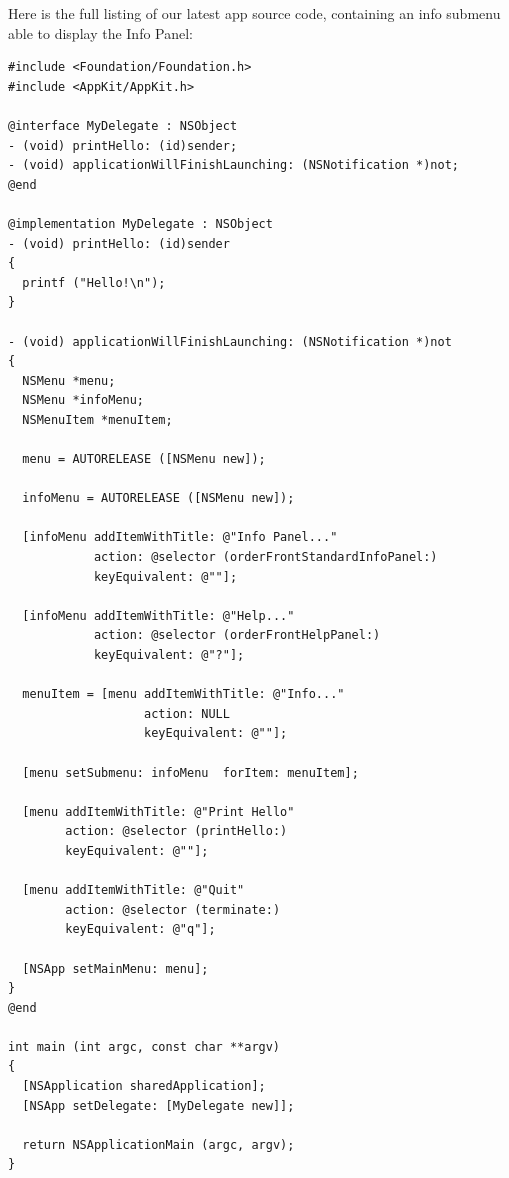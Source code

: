 \documentclass[a4paper]{article}
\begin{document}
Here is the full listing of our latest app source code, 
containing an info submenu able to display the Info Panel:
\begin{verbatim}
#include <Foundation/Foundation.h>
#include <AppKit/AppKit.h>

@interface MyDelegate : NSObject
- (void) printHello: (id)sender;
- (void) applicationWillFinishLaunching: (NSNotification *)not;
@end

@implementation MyDelegate : NSObject 
- (void) printHello: (id)sender
{
  printf ("Hello!\n");
}

- (void) applicationWillFinishLaunching: (NSNotification *)not
{
  NSMenu *menu;
  NSMenu *infoMenu;
  NSMenuItem *menuItem;

  menu = AUTORELEASE ([NSMenu new]);

  infoMenu = AUTORELEASE ([NSMenu new]);

  [infoMenu addItemWithTitle: @"Info Panel..." 
            action: @selector (orderFrontStandardInfoPanel:) 
            keyEquivalent: @""];

  [infoMenu addItemWithTitle: @"Help..." 
            action: @selector (orderFrontHelpPanel:)
            keyEquivalent: @"?"];

  menuItem = [menu addItemWithTitle: @"Info..." 
                   action: NULL 
                   keyEquivalent: @""];

  [menu setSubmenu: infoMenu  forItem: menuItem];

  [menu addItemWithTitle: @"Print Hello"  
        action: @selector (printHello:)  
        keyEquivalent: @""];

  [menu addItemWithTitle: @"Quit"  
        action: @selector (terminate:)  
        keyEquivalent: @"q"];

  [NSApp setMainMenu: menu];
}
@end

int main (int argc, const char **argv)
{ 
  [NSApplication sharedApplication];
  [NSApp setDelegate: [MyDelegate new]];

  return NSApplicationMain (argc, argv);
}
\end{verbatim}
\end{document}
